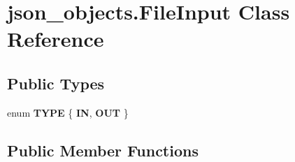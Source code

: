 \hypertarget{classjson__objects_1_1_file_input}{
\section{json\_\-objects.FileInput Class Reference}
\label{classjson__objects_1_1_file_input}
}
\subsection*{Public Types}
\begin{DoxyCompactItemize}
\item 
enum {\bfseries TYPE} \{ {\bfseries IN}, 
{\bfseries OUT}
 \}
\end{DoxyCompactItemize}
\subsection*{Public Member Functions}
